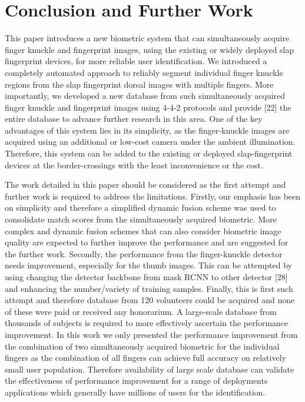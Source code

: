 \section{Conclusion and Further Work\label{conclusion}}

This paper introduces a new biometric system that can simultaneously acquire finger knuckle and fingerprint images, using the existing or widely deployed slap fingerprint devices, for more reliable user identification. We introduced a completely automated approach to reliably segment individual finger knuckle regions from the slap fingerprint dorsal images with multiple fingers. More importantly, we developed a new database from such simultaneously acquired finger knuckle and fingerprint images using 4-4-2 protocols and provide [22] the entire database to advance further research in this area. One of the key advantages of this system lies in its simplicity, as the finger-knuckle images are acquired using an additional or low-cost camera under the ambient illumination. Therefore, this system can be added to the existing or deployed slap-fingerprint devices at the border-crossings with the least inconvenience or the cost.  

The work detailed in this paper should be considered as the first attempt and further work is required to address the limitations. Firstly, our emphasis has been on simplicity and therefore a simplified dynamic fusion scheme was used to consolidate match scores from the simultaneously acquired biometric. More complex and dynamic fusion schemes that can also consider biometric image quality are expected to further improve the performance and are suggested for the further work. Secondly, the performance from the finger-knuckle detector needs improvement, especially for the thumb images. This can be attempted by using changing the detector backbone from mask RCNN to other detector [28] and enhancing the number/variety of training samples. Finally, this is first such attempt and therefore database from 120 volunteers could be acquired and none of these were paid or received any honorarium. A large-scale database from thousands of subjects is required to more effectively ascertain the performance improvement. In this work we only presented the performance improvement from the combination of two simultaneously acquired biometric for the individual fingers as the combination of all fingers can achieve full accuracy on relatively small user population. Therefore availability of large scale database can validate the effectiveness of performance improvement for a range of deployments applications which generally have millions of users for the identification.